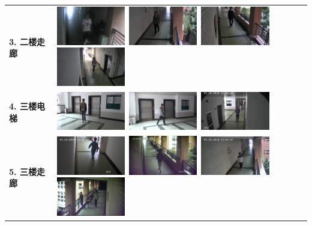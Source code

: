 \begin{table}[ht]
\begin{tabular}{>{\centering\bfseries}m{} >{\centering\arraybackslash}m{}}
3. 二楼走廊 & \includegraphics[width=30mm]{figure/2-1}~\includegraphics[width=30mm]{figure/2-2}~\includegraphics[width=30mm]{figure/2-3}~\includegraphics[width=30mm]{figure/2-4} \\
4. 三楼电梯 & \includegraphics[width=30mm]{figure/3-1}~\includegraphics[width=30mm]{figure/3-2}~\includegraphics[width=30mm]{figure/3-3} \\
5. 三楼走廊 & \includegraphics[width=30mm]{figure/3-4}~\includegraphics[width=30mm]{figure/3-5}~\includegraphics[width=30mm]{figure/3-6}~\includegraphics[width=30mm]{figure/3-7} \\
\bottomrule
\end{tabular}
\end{table}

